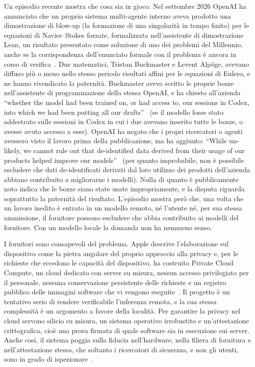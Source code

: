 Un episodio recente mostra che cosa sia in gioco. Nel settembre 2026 OpenAI ha annunciato che un proprio sistema
multi-agente interno aveva prodotto una dimostrazione di blow-up (la formazione di una singolarità in tempo finito) per le equazioni di Navier--Stokes forzate, formalizzata nell'assistente di dimostrazione Lean, un risultato presentato come soluzione di uno dei problemi del Millennio, anche se la corrispondenza dell'enunciato formale con il problema è ancora in corso di verifica~\cite{rits2026navierstokes}. Due matematici,
Tristan Buckmaster e Levent Alpöge, avevano diffuso più o meno nello stesso periodo risultati affini per le equazioni di
Eulero, e ne hanno rivendicato la paternità. Buckmaster aveva scritto le proprie bozze nell'assistente di programmazione
della stessa OpenAI, e ha chiesto all'azienda \foreignlanguage{english}{``whether the model had been trained on, or had access to, our
sessions in Codex, into which we had been putting all our drafts''}~\cite{kahn2026navierstokes} (se il modello fosse
stato addestrato sulle sessioni in Codex in cui i due avevano inserito tutte le bozze, o avesse avuto accesso a esse).
OpenAI ha negato che i propri ricercatori o agenti avessero visto il lavoro prima della pubblicazione, ma ha aggiunto:
\foreignlanguage{english}{``While unlikely, we cannot rule out that de-identified data derived from their usage of our
products helped improve our models''}~\cite{rits2026navierstokes,capella2026navierstokes} (per quanto improbabile, non
è possibile escludere che dati de-identificati derivati dal loro utilizzo dei prodotti dell'azienda abbiano contribuito a
migliorarne i modelli). Nulla di quanto
è pubblicamente noto indica che le bozze siano state usate impropriamente, e la disputa riguarda soprattutto la
paternità del risultato. L'episodio mostra però che, una volta che un lavoro inedito è entrato in un modello remoto, né
l'utente né, per sua stessa ammissione, il fornitore possono escludere che abbia contribuito ai modelli del fornitore.
Con un modello locale la domanda non ha nemmeno senso.

I fornitori sono consapevoli del problema. Apple descrive l'elaborazione sul dispositivo come la pietra angolare del
proprio approccio alla privacy e, per le richieste che eccedono le capacità del dispositivo, ha costruito Private Cloud
Compute, un cloud dedicato con server su misura, nessun accesso privilegiato per il personale, nessuna conservazione
persistente delle richieste e un registro pubblico delle immagini software che vi vengono eseguite~\cite{apple2024pcc}.
Il progetto è un tentativo serio di rendere verificabile l'inferenza remota, e la sua stessa complessità è un argomento
a favore della località. Per garantire la privacy nel cloud servono silicio su misura, un sistema operativo irrobustito
e un'attestazione crittografica, cioè una prova firmata di quale software sia in esecuzione sui server. Anche così, il
sistema poggia sulla fiducia nell'hardware, nella filiera di fornitura e nell'attestazione stessa, che soltanto i
ricercatori di sicurezza, e non gli utenti, sono in grado di ispezionare~\cite{apple2024pcc}.

